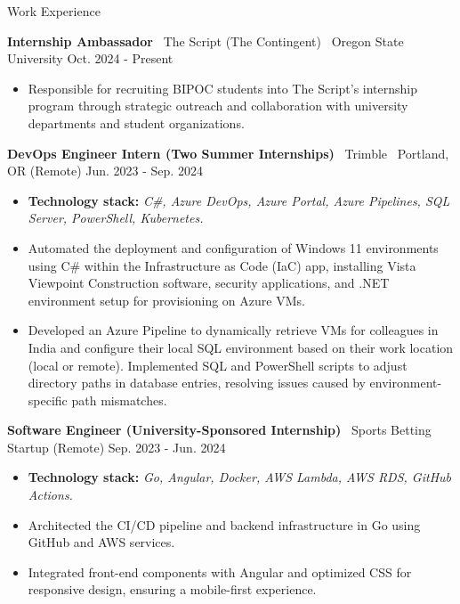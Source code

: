 \documentclass[5pt]{resume}
\begin{document}
\begin{rSection}{Work Experience}
    \item \textbf{Internship Ambassador} \textbar\ The Script (The Contingent) \textbar\ Oregon State University \hfill Oct. 2024 - Present 
    \begin{itemize}[leftmargin=0.15in] \item Responsible for recruiting BIPOC students into The Script’s internship program through strategic outreach and collaboration with university departments and student organizations.
    \end{itemize}
    \item \textbf{DevOps Engineer Intern (Two Summer Internships)} \textbar\ Trimble \textbar\ Portland, OR (Remote) \hfill Jun. 2023 - Sep. 2024
    \begin{itemize}[leftmargin=0.15in]
        \item \textbf{Technology stack:} \textit{C\#, Azure DevOps, Azure Portal, Azure Pipelines, SQL Server, PowerShell, Kubernetes.}
         \item  Automated the deployment and configuration of Windows 11 environments using C\# within the Infrastructure as Code (IaC) app, installing Vista Viewpoint Construction software, security applications, and .NET environment setup for provisioning on Azure VMs. 
         \item Developed an Azure Pipeline to dynamically retrieve VMs for colleagues in India and configure their local SQL environment based on their work location (local or remote). Implemented SQL and PowerShell scripts to adjust directory paths in database entries, resolving issues caused by environment-specific path mismatches.
    \end{itemize}

    \item \textbf{Software Engineer (University-Sponsored Internship)} \textbar\ Sports Betting Startup (Remote) \hfill Sep. 2023 - Jun. 2024
    \begin{itemize}[leftmargin=0.15in]
        \item \textbf{Technology stack:} \textit{Go, Angular, Docker, AWS Lambda, AWS RDS, GitHub Actions.}
        \item Architected the CI/CD pipeline and backend infrastructure in Go using GitHub and AWS services.
        \item Integrated front-end components with Angular and optimized CSS for responsive design, ensuring a mobile-first experience.
    \end{itemize}


\end{rSection}
\end{document}
